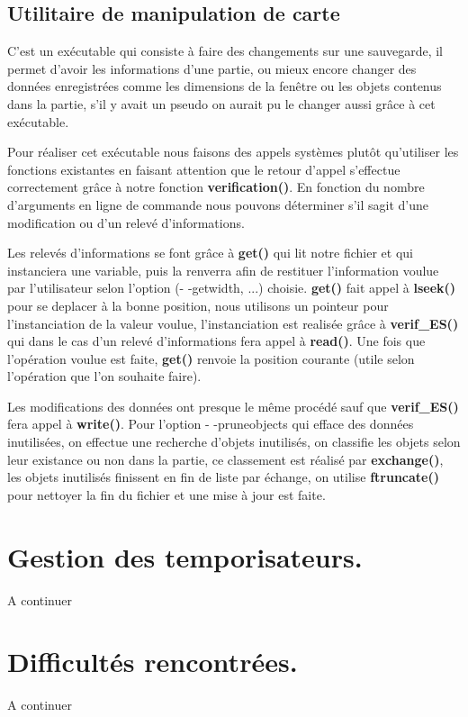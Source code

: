 \documentclass{article}
\begin{document}
        
	\subsection{Utilitaire de manipulation de carte}
	C'est un ex\'ecutable qui consiste \`a faire des changements sur une sauvegarde, il permet d'avoir les informations d'une partie, ou mieux encore changer des donn\'ees enregistr\'ees comme les dimensions de la fen\^etre ou les objets contenus dans la partie, s'il y avait un pseudo on aurait pu le changer aussi gr\^ace \`a cet ex\'ecutable.

        Pour r\'ealiser cet ex\'ecutable nous faisons des appels syst\`{e}mes plut\^ot qu'utiliser les fonctions existantes en faisant attention que le retour d'appel s'effectue correctement gr\^ace \`a notre fonction \textbf{verification()}. En fonction du nombre d'arguments en ligne de commande nous pouvons d\'eterminer s'il sagit d'une modification ou d'un relev\'e d'informations.

        Les relev\'es d'informations se font gr\^ace \`a \textbf{get()} qui lit notre fichier et qui instanciera une variable, puis la renverra afin de restituer l'information voulue par l'utilisateur selon l'option (- -getwidth, ...) choisie. \textbf{get()} fait appel \`a \textbf{lseek()} pour se deplacer \`a la bonne position, nous utilisons un pointeur pour l'instanciation de la valeur voulue, l'instanciation est realis\'ee gr\^ace \`a \textbf{verif\_ES()} qui dans le cas d'un relev\'e d'informations fera appel \`a \textbf{read()}. Une fois que l'op\'eration voulue est faite, \textbf{get()} renvoie la position courante (utile selon l'op\'eration que l'on souhaite faire).

        Les modifications des donn\'ees ont presque le m\^eme proc\'ed\'e sauf que \textbf{verif\_ES()} fera appel \`a \textbf{write()}. Pour l'option - -pruneobjects qui efface des donn\'ees inutilis\'ees, on effectue une recherche d'objets inutilis\'es, on classifie les objets selon leur existance ou non dans la partie, ce classement est r\'ealis\'e par \textbf{exchange()}, les objets inutilis\'es finissent en fin de liste par \'echange, on utilise \textbf{ftruncate()} pour nettoyer la fin du fichier et une mise \`a jour est faite. 


\section{Gestion des temporisateurs.}
A continuer


\section{Difficult\'es rencontr\'ees.}
A continuer
\end{document}
